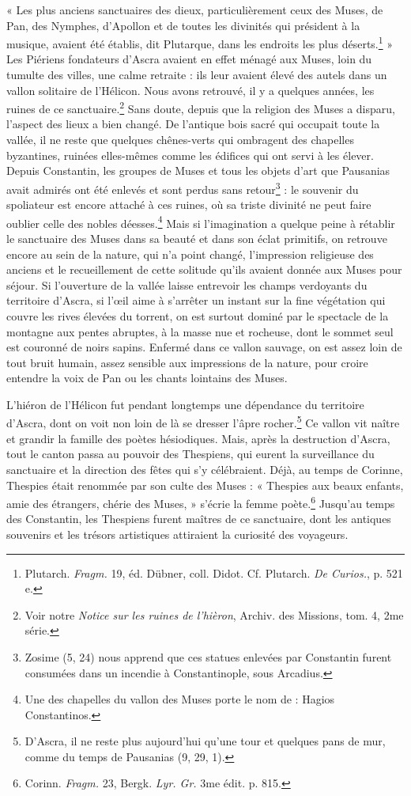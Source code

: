 \documentclass[a4paper, 11pt, oneside, polutonikogreek, french]{article}
\begin{document}
« Les plus anciens sanctuaires des dieux, particulièrement ceux des Muses, de Pan, des Nymphes, d'Apollon et de toutes les divinités qui président à la musique, avaient été établis, dit Plutarque, dans les endroits les plus déserts.\footnote{Plutarch. \emph{Fragm.} 19, éd. Dübner, coll. Didot. Cf. Plutarch. \emph{De Curios.}, p. 521 e.} » Les Piériens fondateurs d'Ascra avaient en effet ménagé aux Muses, loin du tumulte des villes, une calme retraite : ils leur avaient élevé des autels dans un vallon solitaire de l'Hélicon. Nous avons retrouvé, il y a quelques années, les ruines de ce sanctuaire.\footnote{Voir notre \emph{Notice sur les ruines de l'hièron}, Archiv. des Missions, tom. 4, 2me série.} Sans doute, depuis que la religion des Muses a disparu, l'aspect des lieux a bien changé. De l'antique bois sacré qui occupait toute la vallée, il ne reste que quelques chênes-verts qui ombragent des chapelles byzantines, ruinées elles-mêmes comme les édifices qui ont servi à les élever. Depuis Constantin, les groupes de Muses et tous les objets d'art que Pausanias avait admirés ont été enlevés et sont perdus sans retour\footnote{Zosime (5, 24) nous apprend que ces statues enlevées par Constantin furent consumées dans un incendie à Constantinople, sous Arcadius.} : le souvenir du spoliateur est encore attaché à ces ruines, où sa triste divinité ne peut faire oublier celle des nobles déesses.\footnote{Une des chapelles du vallon des Muses porte le nom de : Hagios Constantinos.} Mais si l'imagination a quelque peine à rétablir le sanctuaire des Muses dans sa beauté et dans son éclat primitifs, on retrouve encore au sein de la nature, qui n'a point changé, l'impression religieuse des anciens et le recueillement de cette solitude qu'ils avaient donnée aux Muses pour séjour. Si l'ouverture de la vallée laisse entrevoir les champs verdoyants du territoire d'Ascra, si l'œil aime à s'arrêter un instant sur la fine végétation qui couvre les rives élevées du torrent, on est surtout dominé par le spectacle de la montagne aux pentes abruptes, à la masse nue et rocheuse, dont le sommet seul est couronné de noirs sapins. Enfermé dans ce vallon sauvage, on est assez loin de tout bruit humain, assez sensible aux impressions de la nature, pour croire entendre la voix de Pan ou les chants lointains des Muses.

L'hiéron de l'Hélicon fut pendant longtemps une dépendance du territoire d'Ascra, dont on voit non loin de là se dresser l'âpre rocher.\footnote{D'Ascra, il ne reste plus aujourd'hui qu'une tour et quelques pans de mur, comme du temps de Pausanias (9, 29, 1).} Ce vallon vit naître et grandir la famille des poètes hésiodiques. Mais, après la destruction d'Ascra, tout le canton passa au pouvoir des Thespiens, qui eurent la surveillance du sanctuaire et la direction des fêtes qui s'y célébraient. Déjà, au temps de Corinne, Thespies était renommée par son culte des Muses : « Thespies aux beaux enfants, amie des étrangers, chérie des Muses, » s'écrie la femme poète.\footnote{Corinn. \emph{Fragm.} 23, Bergk. \emph{Lyr. Gr.} 3me édit. p. 815.} Jusqu'au temps des Constantin, les Thespiens furent maîtres de ce sanctuaire, dont les antiques souvenirs et les trésors artistiques attiraient la curiosité des voyageurs.
\end{document}
